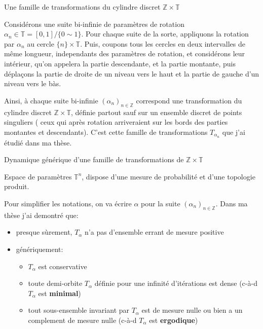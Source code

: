 \documentclass[ignorenonframetext,]{beamer}
\providecommand{\tightlist}{%
  \setlength{\itemsep}{0pt}\setlength{\parskip}{0pt}}
\begin{document}
\begin{frame}{Une famille de transformations du cylindre discret
\(ℤ×𝕋\)}
\protect\hypertarget{une-famille-de-transformations-du-cylindre-discret-ux2124ux1d54b}{}

Considérons une suite bi-infinie de paramètres de rotation
\(α_n∈𝕋 = [0,1]/\{0\sim 1\}\). Pour chaque suite de la sorte, appliquons
la rotation par \(α_n\) au cercle \(\{n\}×𝕋\). Puis, coupons tous les
cercles en deux intervalles de même longueur, independants des
paramètres de rotation, et considérons leur intérieur, qu'on appelera la
partie descendante, et la partie montante, puis déplaçons la partie de
droite de un niveau vers le haut et la partie de gauche d'un niveau vers
le bàs.

Ainsi, à chaque suite bi-infinie \((α_n)_{n∈ℤ}\) correspond une
transformation du cylindre discret \(ℤ×𝕋\), définie partout sauf sur un
ensemble discret de points singuliers ( ceux qui après rotation
arriveraient sur les bords des parties montantes et descendants). C'est
cette famille de transformations \(T_{α_n}\) que j'ai étudié dans ma
thèse.

\end{frame}

\begin{frame}{Dynamique générique d'une famille de transformations de
\(ℤ×𝕋\)}
\protect\hypertarget{dynamique-guxe9nuxe9rique-dune-famille-de-transformations-de-ux2124ux1d54b}{}

Espace de paramètres \(𝕋^n\), dispose d'une mesure de probabilité et
d'une topologie produit.

Pour simplifier les notations, on va écrire \(α\) pour la suite
\((α_n)_{n\in ℤ}\). Dans ma thèse j'ai demontré que:

\begin{itemize}
\item
  presque sùrement, \(T_α\) n'a pas d'ensemble errant de mesure positive
\item
  génériquement:

  \begin{itemize}
  \tightlist
  \item
    \(T_α\) est conservative
  \item
    toute demi-orbite \(T_α\) définie pour une infinité d'itérations est
    dense (c-à-d \(T_α\) est \textbf{minimal})
  \item
    tout sous-ensemble invariant par \(T_α\) est de mesure nulle ou bien
    a un complement de mesure nulle (c-à-d \(T_α\) est
    \textbf{ergodique})
  \end{itemize}
\end{itemize}

\end{frame}
\end{document}
